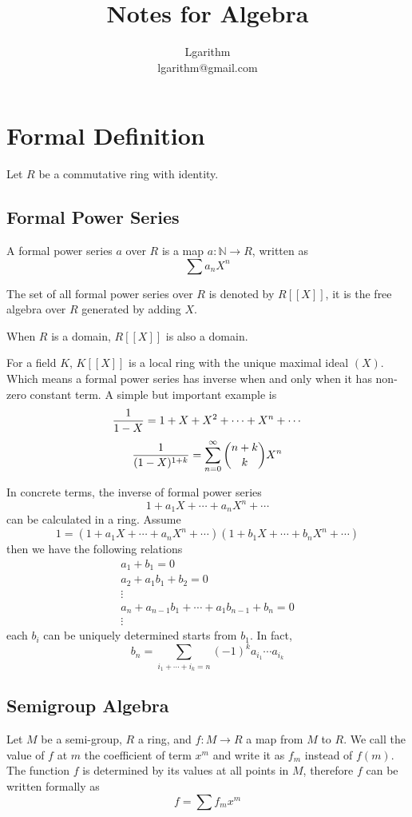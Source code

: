 \documentclass{article}
\title{Notes for Algebra}
\author{Lgarithm\\\mbox{lgarithm@gmail.com}}
\begin{document}
\maketitle
\tableofcontents
\newpage

\section{Formal Definition}
Let $R$ be a commutative ring with identity.

\subsection{Formal Power Series}
A formal power series $a$ over $R$ is a map $a : \mathbb N \to R$,
written as $$\sum a_n X^n$$

The set of all formal power series over $R$ is denoted by $R[[X]]$,
it is the free algebra over $R$ generated by adding $X$.

When $R$ is a domain, $R[[X]]$ is also a domain.

For a field $K$, $K[[X]]$ is a local ring with the unique maximal ideal $(X)$.
Which means a formal power series has inverse when and only when it has non-zero constant term.
A simple but important example is
$${1 \over 1 - X} = 1 + X + X^2 + \cdots + X^n + \cdots$$
$${1 \over (1 - X)^{1 + k}} = \sum_{n = 0}^\infty {n + k \choose k} X^n$$

In concrete terms, the inverse of formal power series
$$1 + a_1 X + \cdots + a_n X^n + \cdots$$
can be calculated in a ring. Assume
$$1 = (1 + a_1 X + \cdots + a_n X^n + \cdots) (1 + b_1 X + \cdots + b_n X^n + \cdots)$$
then we have the following relations
\begin{align*}
    a_1 + b_1 = 0 \\
    a_2 + a_1b_1 + b_2 = 0 \\
    \vdots \\
    a_n + a_{n-1}b_1 + \cdots + a_1b_{n-1} + b_n = 0 \\
    \vdots
\end{align*}
each $b_i$ can be uniquely determined starts from $b_1$. In fact,
$$b_n = \sum_{i_1 + \cdots + i_k = n} (-1)^k a_{i_1} \cdots a_{i_k}$$

\subsection{Semigroup Algebra}
Let $M$ be a semi-group, $R$ a ring, and $f : M \to R$ a map from $M$ to $R$.
We call the value of $f$ at $m$ the coefficient of term $x^m$ and write it as $f_m$ instead of $f(m)$.
The function $f$ is determined by its values at all points in $M$, therefore $f$ can be written
formally as $$f = \sum f_m x^m$$
\end{document}
